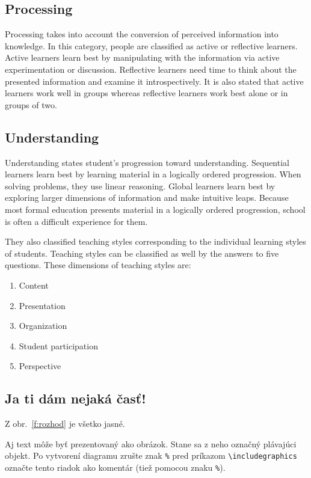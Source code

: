 \documentclass[10pt,twoside,english,a4paper]{article}
\begin{document}
{\subsection{Processing}
Processing takes into account the conversion of perceived information into knowledge. In this category, people are classified as active or reflective learners. Active learners learn best by manipulating with the information via active experimentation or discussion. Reflective learners need time to think about the presented information and examine it introspectively. It is also stated that active learners work well in groups whereas reflective learners work best alone or in groups of two.\cite{FelderArticle}}
{\subsection{Understanding}
Understanding states student's progression toward understanding. Sequential learners learn best by learning material in a logically ordered progression. When solving problems, they use linear reasoning. Global learners learn best by exploring larger dimensions of information and make intuitive leaps. Because most formal education presents material in a logically ordered progression, school is often a difficult experience for them.\cite{FelderArticle, AdaptiveEL}}


They also classified teaching styles corresponding to the individual learning styles of students. Teaching styles can be classified as well by the answers to five questions. These dimensions of teaching styles are:
\begin{enumerate}
\item Content
\item Presentation
\item Organization
\item Student participation
\item Perspective
\end{enumerate}

\subsection{Ja ti dám nejaká časť!}
Z obr.~\ref{f:rozhod} je všetko jasné. 

\begin{figure*}[tbh]
\centering
Aj text môže byť prezentovaný ako obrázok. Stane sa z neho označný plávajúci objekt. Po vytvorení diagramu zrušte znak \texttt{\%} pred príkazom \verb|\includegraphics| označte tento riadok ako komentár (tiež pomocou znaku \texttt{\%}).
\caption{Rozhodujúci argument.}
\label{f:rozhod}
\end{figure*}
\end{document}
